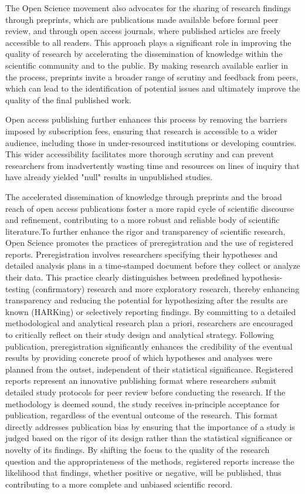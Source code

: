 \documentclass{article}
\begin{document}
The Open Science movement also advocates for the sharing of research findings through preprints, which are publications made available before formal peer review, and through open access journals, where published articles are freely accessible to all readers. This approach plays a significant role in improving the quality of research by accelerating the dissemination of knowledge within the scientific community and to the public. By making research available earlier in the process, preprints invite a broader range of scrutiny and feedback from peers, which can lead to the identification of potential issues and ultimately improve the quality of the final published work.

Open access publishing further enhances this process by removing the barriers imposed by subscription fees, ensuring that research is accessible to a wider audience, including those in under-resourced institutions or developing countries. This wider accessibility facilitates more thorough scrutiny and can prevent researchers from inadvertently wasting time and resources on lines of inquiry that have already yielded "null" results in unpublished studies.

The accelerated dissemination of knowledge through preprints and the broad reach of open access publications foster a more rapid cycle of scientific discourse and refinement, contributing to a more robust and reliable body of scientific literature.To further enhance the rigor and transparency of scientific research, Open Science promotes the practices of preregistration and the use of registered reports. Preregistration involves researchers specifying their hypotheses and detailed analysis plans in a time-stamped document before they collect or analyze their data. This practice clearly distinguishes between predefined hypothesis-testing (confirmatory) research and more exploratory research, thereby enhancing transparency and reducing the potential for hypothesizing after the results are known (HARKing) or selectively reporting findings. By committing to a detailed methodological and analytical research plan a priori, researchers are encouraged to critically reflect on their study design and analytical strategy. Following publication, preregistration significantly enhances the credibility of the eventual results by providing concrete proof of which hypotheses and analyses were planned from the outset, independent of their statistical significance. Registered reports represent an innovative publishing format where researchers submit detailed study protocols for peer review before conducting the research. If the methodology is deemed sound, the study receives in-principle acceptance for publication, regardless of the eventual outcome of the research. This format directly addresses publication bias by ensuring that the importance of a study is judged based on the rigor of its design rather than the statistical significance or novelty of its findings. By shifting the focus to the quality of the research question and the appropriateness of the methods, registered reports increase the likelihood that findings, whether positive or negative, will be published, thus contributing to a more complete and unbiased scientific record.
\end{document}
